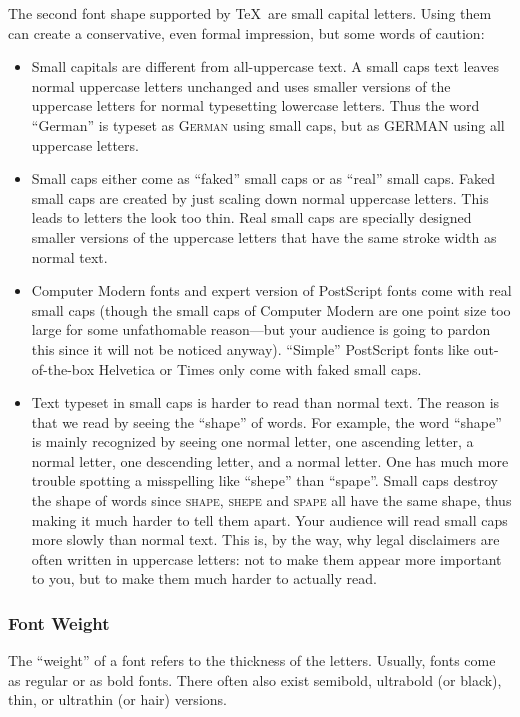 The second font shape supported by \TeX\ are small capital letters. Using them can create a conservative, even formal impression, but some words of caution:
\begin{itemize}
\item
  Small capitals are different from all-uppercase text. A small caps text leaves normal uppercase letters unchanged and uses smaller versions of the uppercase letters for normal typesetting lowercase letters. Thus the word ``German'' is typeset as \textsc{German} using small caps, but as \uppercase{German} using all uppercase letters.
\item
  Small caps either come as ``faked'' small caps or as ``real'' small caps. Faked small caps are created by just scaling down normal uppercase letters. This leads to letters the look too thin. Real small caps are specially designed smaller versions of the uppercase letters that have the same stroke width as normal text.
\item
  Computer Modern fonts and expert version of PostScript fonts come with real small caps (though the small caps of Computer Modern are one point size too large for some unfathomable reason---but your audience is going to pardon this since it will not be noticed anyway). ``Simple'' PostScript fonts like out-of-the-box Helvetica or Times only come with faked small caps.
\item
  Text typeset in small caps is harder to read than normal text. The reason is that we read by seeing the ``shape'' of words. For example, the word ``shape'' is mainly recognized by seeing one normal letter, one ascending letter, a normal letter, one descending letter, and a normal letter. One has much more trouble spotting a misspelling like ``shepe''  than ``spape''. Small caps destroy the shape of words since \textsc{shape}, \textsc{shepe} and \textsc{spape} all have the same shape, thus making it much harder to tell them apart. Your audience will read small caps more slowly than normal text. This is, by the way, why legal disclaimers are often written in uppercase letters: not to make them appear more important to you, but to make them much harder to actually read.
\end{itemize}

\subsubsection{Font Weight}

The ``weight'' of a font refers to the thickness of the letters. Usually, fonts come as regular or as bold fonts. There often also exist semibold, ultrabold (or black), thin, or ultrathin (or hair) versions.


